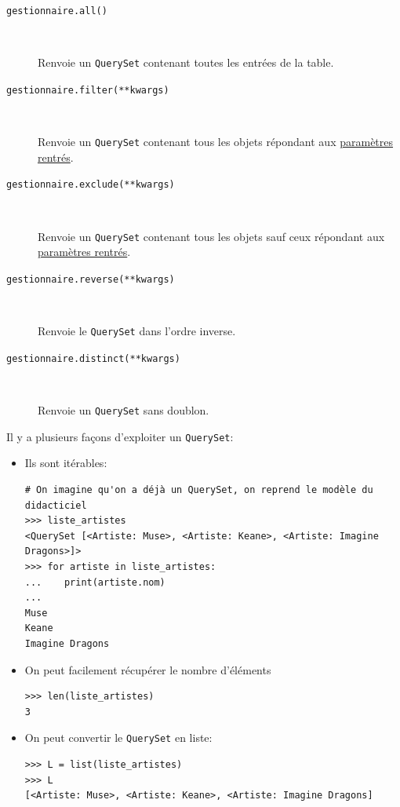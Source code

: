 \documentclass[a4paper, 10pt]{article}
\begin{document}
{\begin{description}
    \item[\texttt{gestionnaire.all()}]~

    Renvoie un \texttt{QuerySet} contenant toutes les entrées de la table.

    \item[\texttt{gestionnaire.filter(**kwargs)}]~

    Renvoie un \texttt{QuerySet} contenant tous les objets répondant aux \href{https://docs.djangoproject.com/fr/2.0/ref/models/querysets/#field-lookups}{paramètres rentrés}.

    \item[\texttt{gestionnaire.exclude(**kwargs)}]~

    Renvoie un \texttt{QuerySet} contenant tous les objets sauf ceux répondant aux \href{https://docs.djangoproject.com/fr/2.0/ref/models/querysets/#field-lookups}{paramètres rentrés}.

    \item[\texttt{gestionnaire.reverse(**kwargs)}]~

    Renvoie le \texttt{QuerySet} dans l'ordre inverse.

    \item[\texttt{gestionnaire.distinct(**kwargs)}]~

    Renvoie un \texttt{QuerySet} sans doublon.
\end{description}

Il y a plusieurs façons d'exploiter un \texttt{QuerySet}:
\begin{itemize}
    \item Ils sont itérables:
    \begin{verbatim}
# On imagine qu'on a déjà un QuerySet, on reprend le modèle du didacticiel
>>> liste_artistes
<QuerySet [<Artiste: Muse>, <Artiste: Keane>, <Artiste: Imagine Dragons>]>
>>> for artiste in liste_artistes:
...    print(artiste.nom)
...
Muse
Keane
Imagine Dragons
    \end{verbatim}

    \item On peut facilement récupérer le nombre d'éléments
    \begin{verbatim}
>>> len(liste_artistes)
3
    \end{verbatim}

    \item On peut convertir le \texttt{QuerySet} en liste:
    \begin{verbatim}
>>> L = list(liste_artistes)
>>> L
[<Artiste: Muse>, <Artiste: Keane>, <Artiste: Imagine Dragons]
    \end{verbatim}


\end{itemize}}
\end{document}
